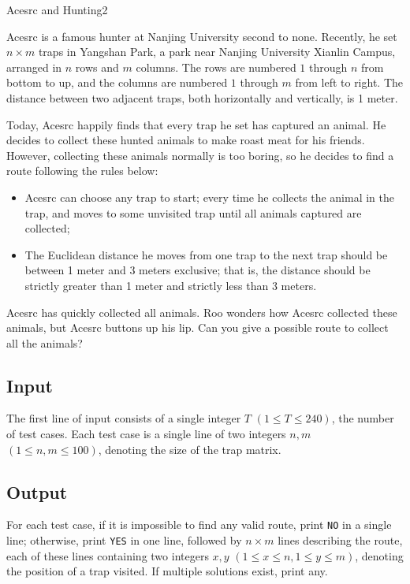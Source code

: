 \begin{Problem}{Acesrc and Hunting}{2}

Acesrc is a famous hunter at Nanjing University second to none. Recently, he set $n \times m$ traps in Yangshan Park, a park near Nanjing University Xianlin Campus, arranged in $n$ rows and $m$ columns. The rows are numbered $1$ through $n$ from bottom to up, and the columns are numbered $1$ through $m$ from left to right. The distance between two adjacent traps, both horizontally and vertically, is 1 meter.

Today, Acesrc happily finds that every trap he set has captured an animal. He decides to collect these hunted animals to make roast meat for his friends. However, collecting these animals normally is too boring, so he decides to find a route following the rules below:
\begin{itemize}
\item Acesrc can choose any trap to start; every time he collects the animal in the trap, and moves to some unvisited trap until all animals captured are collected;
\item The Euclidean distance he moves from one trap to the next trap should be between 1 meter and 3 meters exclusive; that is, the distance should be strictly greater than 1 meter and strictly less than 3 meters.
\end{itemize}

Acesrc has quickly collected all animals. Roo wonders how Acesrc collected these animals, but Acesrc buttons up his lip. Can you give a possible route to collect all the animals?

\subsection*{Input}

The first line of input consists of a single integer $T$ $(1 \leq T \leq 240)$, the number of test cases. Each test case is a single line of two integers $n, m$ $(1 \leq n, m \leq 100)$, denoting the size of the trap matrix.

\subsection*{Output}

For each test case, if it is impossible to find any valid route, print \texttt{NO} in a single line; otherwise, print \texttt{YES} in one line, followed by $n \times m$ lines describing the route, each of these lines containing two integers $x, y$ $(1 \leq x \leq n, 1 \leq y \leq m)$, denoting the position of a trap visited. If multiple solutions exist, print any.


\end{Problem}
